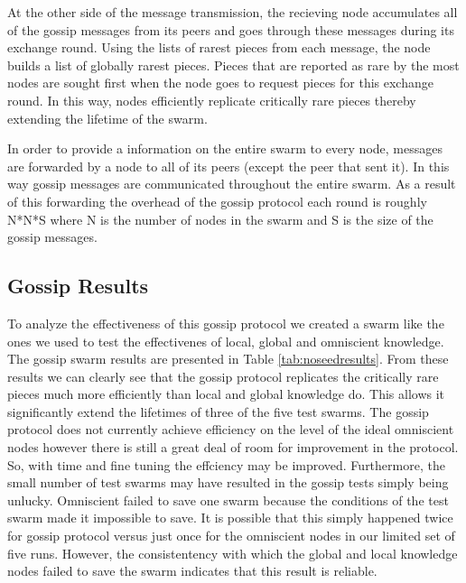 At the other side of the message transmission, the recieving node
accumulates all of the gossip messages from its peers and goes
through these messages during its exchange round. Using the lists of
rarest pieces from each message, the node builds a list of globally
rarest pieces. Pieces that are reported as rare by the most nodes are
sought first when the node goes to request pieces for this exchange
round. In this way, nodes efficiently replicate critically rare pieces
thereby extending the lifetime of the swarm. 

In order to provide a information on the entire swarm to every node,
messages are forwarded by a node to all of its peers (except the peer
that sent it). In this way gossip messages are communicated throughout
the entire swarm. As a result of this forwarding the overhead of the
gossip protocol each round is roughly N*N*S where N is the number of
nodes in the swarm and S is the size of the gossip messages.

\subsection{Gossip Results}

To analyze the effectiveness of this gossip protocol we created a
swarm like the ones we used to test the effectivenes of local, global
and omniscient knowledge. The gossip swarm results are presented in
Table \ref{tab:noseedresults}. From these results we can clearly see that the gossip
protocol replicates the critically rare pieces much more efficiently
than local and global knowledge do. This allows it significantly extend the
lifetimes of three of the five test swarms. The gossip protocol does
not currently achieve efficiency on the level of the ideal omniscient
nodes however there is still a great deal of room for improvement
in the protocol. So, with time and fine tuning the effciency may be
improved. Furthermore, the small number of test swarms may have
resulted in the gossip tests simply being unlucky. Omniscient failed
to save one swarm because the conditions of the test swarm made it
impossible to save. It is possible that this simply happened twice for
gossip protocol versus just once for the omniscient nodes in our
limited set of five runs. However, the consistentency with which the
global and local knowledge nodes failed to save the swarm indicates
that this result is reliable.

%


